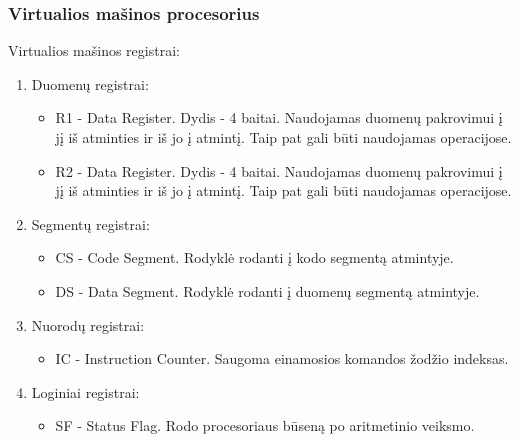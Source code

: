 	\subsubsection{Virtualios mašinos procesorius}
	Virtualios mašinos registrai:
	\begin{enumerate}
	\item Duomenų registrai: 
		\begin{itemize}
		\item R1 - Data Register. Dydis - 4 baitai. Naudojamas duomenų pakrovimui į jį iš atminties ir iš jo į atmintį. Taip pat gali būti naudojamas operacijose.
		\item R2 - Data Register. Dydis - 4 baitai. Naudojamas duomenų pakrovimui į jį iš atminties ir iš jo į atmintį. Taip pat gali būti naudojamas operacijose.
		\end{itemize}
	\item Segmentų registrai:
		\begin{itemize}
		\item CS - Code Segment. Rodyklė rodanti į kodo segmentą atmintyje.
		\item DS - Data Segment. Rodyklė rodanti į duomenų segmentą atmintyje.
		\end{itemize}
	\item Nuorodų registrai:
		\begin{itemize}
		\item IC - Instruction Counter. Saugoma einamosios komandos žodžio indeksas.
		\end{itemize}
	\item Loginiai registrai:
		\begin{itemize}
		\item SF - Status Flag. Rodo procesoriaus būseną po aritmetinio veiksmo.
		\end{itemize}
	\end{enumerate}
